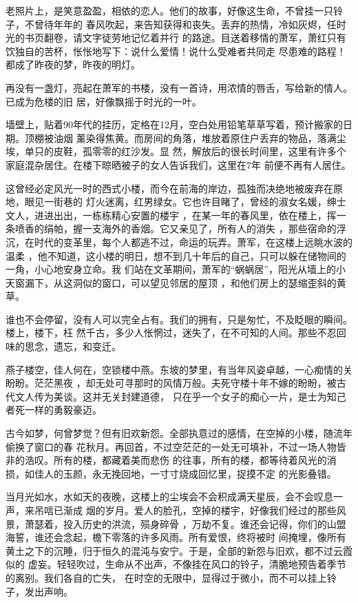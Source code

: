 \documentclass[12pt,a4paper]{article}
\begin{document}
		老照片上，是笑意盈盈，相依的恋人。他们的故事，好像这生命，不曾挂一只铃子，不曾待年年的
	春风吹起，来告知获得和丧失。丢弃的热情，冷如灰烬，任时光的书页翻卷，请文字徒劳地记忆着并行
	的路途。目送着移情的萧军，萧红只有饮独自的苦杯，怅怅地写下：说什么爱情！说什么受难者共同走
	尽患难的路程！都成了昨夜的梦，昨夜的明灯。


		再没有一盏灯，亮起在萧军的书楼，没有一首诗，用浓情的唇舌，写给新的情人。已成为危楼的旧
	居，好像飘摇于时光的一叶。

		墙壁上，贴着90年代的挂历，定格在12月，空白处用铅笔草草写着，预计搬家的日期。顶棚被油烟
	薰染得焦黄。而房间的角落，堆放着原住户丢弃的物品，落满尘埃，单只的皮鞋，孤零零的红沙发。显
	然，解放后的很长时间里，这里有许多个家庭混杂居住。在楼下晾晒被子的女人告诉我们，这里在7年
	前便不再有人居住。

		这曾经必定风光一时的西式小楼，而今在前海的岸边，孤独而决绝地被废弃在原地，眼见一街巷的
	灯火迷离，红男绿女。它也许目睹了，曾经的淑女名媛，绅士文人，进进出出，一栋栋精心安置的楼宇
	，在某一年的春风里，依在楼上，挥一条喷香的绢帕，握一支海外的香烟。它又亲见了，所有人的消失
	，那些宿命的浮沉，在时代的变革里，每个人都逃不过，命运的玩弄。萧军，在这楼上远眺水波的温柔
	，他不知道，这小楼的明日，想不到几十年后的自己，只可以躲在储物间的一角，小心地安身立命。我
	们站在文革期间，萧军的“蜗蜗居”，阳光从墙上的小天窗漏下，从这洞似的窗口，可以望见邻居的屋顶
	，和他们房上的瑟缩歪斜的黄草。

		谁也不会停留，没有人可以完全占有。我们的拥有，只是匆忙，不及眨眼的瞬间。楼上，楼下，枉
	然千古，多少人怅惘过，迷失了，在不可知的人间。那些不忍回味的思念，遗忘，和变迁。

		燕子楼空，佳人何在，空锁楼中燕。东坡的梦里，有当年风姿卓越，一心痴情的关盼盼。茫茫黑夜
	，却无处可寻那时的风情万般。夫死守楼十年不嫁的盼盼，被古代文人传为美谈。这并无关封建道德，
	只在乎一个女子的痴心一片，是士为知己者死一样的勇毅豪迈。

		古今如梦，何曾梦觉？但有旧欢新怨。全部执意过的感情，在空掉的小楼，随流年偷换了窗口的春
	花秋月。再回首，不过空茫茫的一处无可填补，不过一场人物皆非的浩叹。所有的楼，都藏着美而悲伤
	的往事，所有的楼，都等待着风光的消损，如佳人的玉颜，永无挽回地，一寸寸烧成回忆里，捉摸不定
	的光影叠错。

		当月光如水，水如天的夜晚，这楼上的尘埃会不会积成满天星辰，会不会叹息一声，来吊唁已渐成
	烟的岁月。爱人的脸孔，空掉的楼宇，好像我们经过的那些风景，萧瑟着，投入历史的洪流，殒身碎骨
	，万劫不复。谁还会记得，你们的山盟海誓，谁还会念起，檐下零落的许多风雨。所有爱恨，终将被时
	间掩埋，像所有黄土之下的沉睡，归于恒久的混沌与安宁。于是，全部的新怨与旧欢，都不过云霞似的
	虚妄。轻轻吹过，生命从不出声，不像挂在风口的铃子，清脆地预告着季节的离别。我们各自的亡失，
	在时空的无限中，显得过于微小，而不可以挂上铃子，发出声响。
\end{document}
